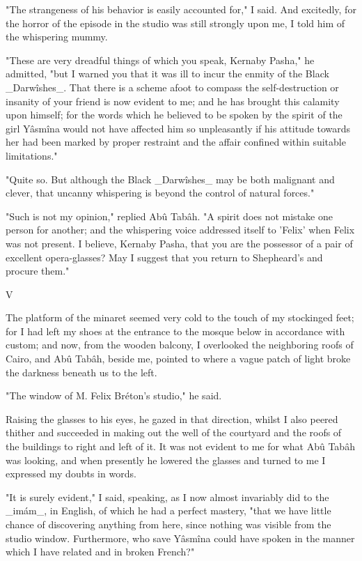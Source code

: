 "The strangeness of his behavior is easily accounted for," I said.
And excitedly, for the horror of the episode in the studio was still
strongly upon me, I told him of the whispering mummy.

"These are very dreadful things of which you speak, Kernaby Pasha," he
admitted, "but I warned you that it was ill to incur the enmity of the
Black _Darwîshes_. That there is a scheme afoot to compass the
self-destruction or insanity of your friend is now evident to me; and
he has brought this calamity upon himself; for the words which he
believed to be spoken by the spirit of the girl Yâsmîna would not have
affected him so unpleasantly if his attitude towards her had been
marked by proper restraint and the affair confined within suitable
limitations."

"Quite so. But although the Black _Darwîshes_ may be both malignant
and clever, that uncanny whispering is beyond the control of natural
forces."

"Such is not my opinion," replied Abû Tabâh. "A spirit does not
mistake one person for another; and the whispering voice addressed
itself to 'Felix' when Felix was not present. I believe, Kernaby
Pasha, that you are the possessor of a pair of excellent
opera-glasses? May I suggest that you return to Shepheard's and
procure them."


V

The platform of the minaret seemed very cold to the touch of my
stockinged feet; for I had left my shoes at the entrance to the mosque
below in accordance with custom; and now, from the wooden balcony, I
overlooked the neighboring roofs of Cairo, and Abû Tabâh, beside me,
pointed to where a vague patch of light broke the darkness beneath us
to the left.

"The window of M. Felix Bréton's studio," he said.

Raising the glasses to his eyes, he gazed in that direction, whilst
I also peered thither and succeeded in making out the well of the
courtyard and the roofs of the buildings to right and left of it.
It was not evident to me for what Abû Tabâh was looking, and when
presently he lowered the glasses and turned to me I expressed my
doubts in words.

"It is surely evident," I said, speaking, as I now almost invariably
did to the _imám_, in English, of which he had a perfect mastery,
"that we have little chance of discovering anything from here, since
nothing was visible from the studio window. Furthermore, who save
Yâsmîna could have spoken in the manner which I have related and in
broken French?"


